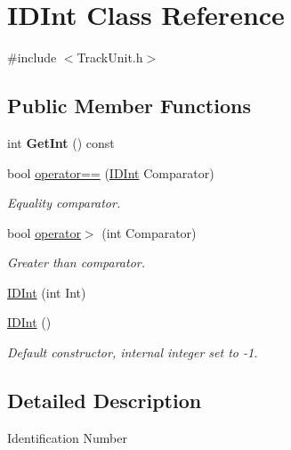 \hypertarget{class_i_d_int}{}\section{I\+D\+Int Class Reference}
\label{class_i_d_int}


{\ttfamily \#include $<$Track\+Unit.\+h$>$}

\subsection*{Public Member Functions}
\begin{DoxyCompactItemize}
\item 
\mbox{\label{class_i_d_int_a3c40e609e12caab2063aa7f3ff8b8ea7}} 
int {\bfseries Get\+Int} () const
\item 
\mbox{\label{class_i_d_int_ae083414184db298f8abbfbe791db82de}} 
bool \mbox{\hyperlink{class_i_d_int_ae083414184db298f8abbfbe791db82de}{operator==}} (\mbox{\hyperlink{class_i_d_int}{I\+D\+Int}} Comparator)
\begin{DoxyCompactList}\small\item\em Equality comparator. \end{DoxyCompactList}\item 
\mbox{\label{class_i_d_int_ae309faa19a8c2f2a6f5e16c7cd64f184}} 
bool \mbox{\hyperlink{class_i_d_int_ae309faa19a8c2f2a6f5e16c7cd64f184}{operator$>$}} (int Comparator)
\begin{DoxyCompactList}\small\item\em Greater than comparator. \end{DoxyCompactList}\item 
\mbox{\hyperlink{class_i_d_int_ae51fdc864457738e484bb91c829b082c}{I\+D\+Int}} (int Int)
\item 
\mbox{\label{class_i_d_int_ae0583f8509efd2cff2fa60b52e7b5cea}} 
\mbox{\hyperlink{class_i_d_int_ae0583f8509efd2cff2fa60b52e7b5cea}{I\+D\+Int}} ()
\begin{DoxyCompactList}\small\item\em Default constructor, internal integer set to -\/1. \end{DoxyCompactList}\end{DoxyCompactItemize}


\subsection{Detailed Description}
Identification Number

